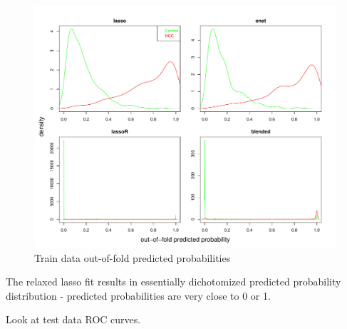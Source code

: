 \documentclass[
]{book}
\begin{document}
\begin{figure}
\centering
\includegraphics{Static/figures/hcc5hmC-glmnetFit-trainOOFprops-1.pdf}
\caption{\label{fig:hcc5hmC-glmnetFit-trainOOFprops}Train data out-of-fold predicted probabilities}
\end{figure}

The relaxed lasso fit results in essentially dichotomized predicted probability
distribution - predicted probabilities are very close to 0 or 1.

Look at test data ROC curves.
\end{document}
